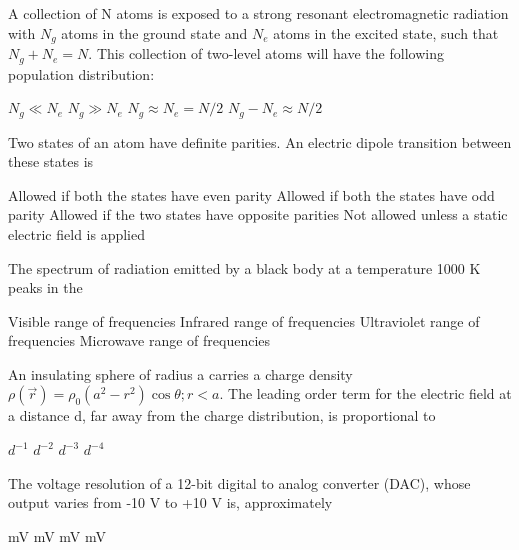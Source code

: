 \documentclass{exam}
\begin{document}
\begin{questions}
\question A collection of N atoms is exposed to a strong resonant electromagnetic radiation with $N_g$ atoms in the ground state and $N_e$ atoms in the excited state, such that $N_g+N_e=N$. This collection of two-level atoms will have the following population distribution:\hfill{}

\begin{oneparchoices}
	\choice $N_g \ll N_e$ \choice $N_g \gg N_e$ \choice $N_g \approx N_e = N/2$ \choice $N_g - N_e \approx N/2$
\end{oneparchoices}

\question Two states of an atom have definite parities. An electric dipole transition between these states is\hfill{}

\begin{choices}
	\choice Allowed if both the states have even parity
	\choice Allowed if both the states have odd parity
	\choice Allowed if the two states have opposite parities
	\choice Not allowed unless a static electric field is applied
\end{choices}

\question The spectrum of radiation emitted by a black body at a temperature 1000 K peaks in the\hfill{}

\begin{choices}
	\begin{multicols}{2}
	 \choice Visible range of frequencies \choice Infrared range of frequencies
	\choice Ultraviolet range of frequencies \choice Microwave range of frequencies
	\end{multicols}
\end{choices}

\question An insulating sphere of radius a carries a charge density $\rho(\vec{r})=\rho_{0}(a^{2}-r^{2})\cos\theta; r<a$. The leading order term for the electric field at a distance d, far away from the charge distribution, is proportional to\hfill{}

\begin{oneparchoices}
	\choice $d^{-1}$ \choice $d^{-2}$ \choice $d^{-3}$ \choice $d^{-4}$
\end{oneparchoices}

\question The voltage resolution of a 12-bit digital to analog converter (DAC), whose output varies from -10 V to +10 V is, approximately\hfill{}

\begin{oneparchoices}
	 mV  mV  mV  mV
\end{oneparchoices}


\end{questions}
\end{document}
